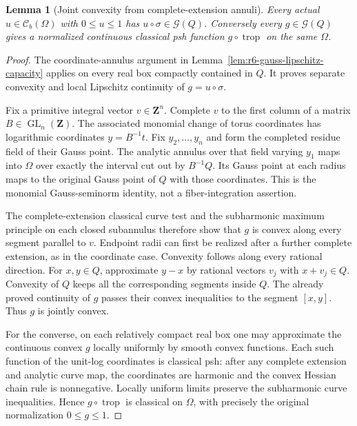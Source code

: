 \documentclass[11pt,a4paper]{article}
\numberwithin{equation}{section}
\newtheorem{lemma}[theorem]{Lemma}
\theoremstyle{definition}
\theoremstyle{remark}
\begin{document}
\begin{lemma}[Joint convexity from complete-extension annuli]
\label{lem:r6-joint-gauss-convexity}
Every actual $u\in\mathcal C_b(\Omega)$ with $0\le u\le1$ has
$u\circ\sigma\in\mathcal G(Q)$. Conversely every
$g\in\mathcal G(Q)$ gives a normalized continuous classical psh
function $g\circ\operatorname{trop}$ on the same $\Omega$.
\end{lemma}

\begin{proof}
The coordinate-annulus argument in
Lemma~\ref{lem:r6-gauss-lipschitz-capacity} applies on every real box
compactly contained in $Q$. It proves separate convexity and local
Lipschitz continuity of $g=u\circ\sigma$.

Fix a primitive integral vector $v\in\mathbf Z^n$. Complete $v$ to
the first column of a matrix $B\in\operatorname{GL}_n(\mathbf Z)$.
The associated monomial change of torus coordinates has logarithmic
coordinates $y=B^{-1}t$. Fix $y_2,\ldots,y_n$ and form the completed
residue field of their Gauss point. The analytic annulus over that
field varying $y_1$ maps into $\Omega$ over exactly the interval
cut out by $B^{-1}Q$. Its Gauss point at each radius maps to the
original Gauss point of $Q$ with those coordinates. This is the
monomial Gauss-seminorm identity, not a fiber-integration assertion.

The complete-extension classical curve test and the subharmonic
maximum principle on each closed subannulus therefore show that
$g$ is convex along every segment parallel to $v$. Endpoint radii
can first be realized after a further complete extension, as in the
coordinate case. Convexity follows along every rational direction.
For $x,y\in Q$, approximate $y-x$ by rational vectors $v_j$ with
$x+v_j\in Q$. Convexity of $Q$ keeps all the corresponding segments
inside $Q$. The already proved continuity of $g$ passes their convex
inequalities to the segment $[x,y]$. Thus $g$ is jointly convex.

For the converse, on each relatively compact real box one may
approximate the continuous convex $g$ locally uniformly by smooth
convex functions. Each such function of the unit-log coordinates
is classical psh: after any complete extension and analytic curve
map, the coordinates are harmonic and the convex Hessian chain rule
is nonnegative. Locally uniform limits preserve the subharmonic
curve inequalities. Hence $g\circ\operatorname{trop}$ is classical
on $\Omega$, with precisely the original normalization $0\le g\le1$.
\end{proof}
\end{document}
